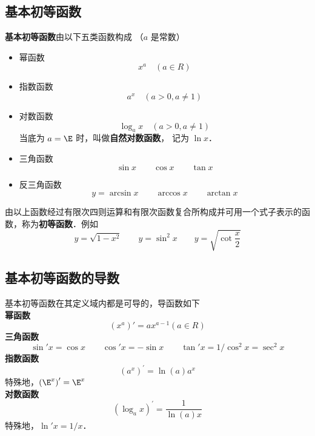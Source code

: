 

\subsection{基本初等函数}
\textbf{基本初等函数}由以下五类函数构成 （$a$ 是常数）

\begin{itemize}
\item 幂函数
\begin{equation}
{x^a} \quad(a \in R)
\end{equation}
\item 指数函数
\begin{equation}
{a^x} \quad(a > 0 , a \ne 1)
\end{equation}
\item 对数函数
\begin{equation}
{\log _a}x \quad(a > 0 , a \ne 1)
\end{equation}
当底为 $a = \E$ 时，叫做\textbf{自然对数函数}， 记为 $\ln x$． \\
\item 三角函数
\begin{equation}
\sin x \qquad  \cos x \qquad \tan x
\end{equation}
\item 反三角函数
\begin{equation}
y = \arcsin x  \qquad \arccos x  \qquad \arctan x
\end{equation}
\end{itemize}

由以上函数经过有限次四则运算和有限次函数复合所构成并可用一个式子表示的函数，称为\textbf{初等函数}．例如
\begin{equation}
y = \sqrt {1 - {x^2}}\qquad y = {\sin ^2}x\qquad y = \sqrt {\cot \frac{x}{2}} 
\end{equation}



\subsection{基本初等函数的导数}

基本初等函数在其定义域内都是可导的，导函数如下\\
\textbf{幂函数}
\begin{equation}
\left( {{x^a}} \right)' = a {x^{a - 1}}   \left( {a \in R} \right)
\end{equation}
\textbf{三角函数}
\begin{equation}
\sin' x = \cos x \qquad \cos' x =  - \sin x \qquad
\tan'x = 1/{\cos ^2}x = {\sec ^2}x
\end{equation}
\textbf{指数函数}
\begin{equation}
{\left( {{a^x}} \right)^\prime } = \ln \left( a \right){a^x}
\end{equation}
特殊地，${\left( {{\E^x}} \right)^\prime } = {\E^x}$\\
\textbf{对数函数}
\begin{equation}
{\left( {{{\log }_a}x} \right)^\prime } = \frac{1}{{\ln \left( a \right)x}}
\end{equation}
特殊地，$\ln' x= 1/x$．

